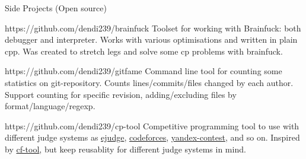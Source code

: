 
\begin{projects}{Side Projects (Open source)}

{https://github.com/dendi239/brainfuck}
{Toolset for working with Brainfuck: both debugger and interpreter.
Works with various optimisations and written in plain cpp.
Was created to stretch legs and solve some cp problems with brainfuck.
}

{https://github.com/dendi239/gitfame}
{Command line tool for counting some statistics on git-repository.
Counts lines/commits/files changed by each author.
Support counting for specific revision, adding/excluding files by format/language/regexp.
}


{https://github.com/dendi239/cp-tool}
{Competitive programming tool to use with different judge systems as \href{https://ejudge.ru}{ejudge}, \href{https://codeforces.com}{codeforces}, \href{https://contest.yandex.ru}{yandex-contest}, and so on.
Inspired by \href{https://github.com/xalanq/cf-tool}{cf-tool}, but keep reusablity for different judge systems in mind.
}


\end{projects}
